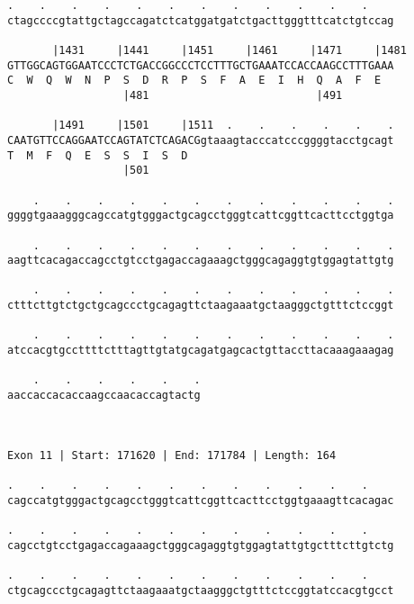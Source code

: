 \documentclass{article}
\begin{document}
\begin{Verbatim}
.    .    .    .    .    .    .    .    .    .    .    .    
ctagccccgtattgctagccagatctcatggatgatctgacttgggtttcatctgtccag
                                                            
       |1431     |1441     |1451     |1461     |1471     |1481
GTTGGCAGTGGAATCCCTCTGACCGGCCCTCCTTTGCTGAAATCCACCAAGCCTTTGAAA
C  W  Q  W  N  P  S  D  R  P  S  F  A  E  I  H  Q  A  F  E  
                  |481                          |491        
  
       |1491     |1501     |1511  .    .    .    .    .    .
CAATGTTCCAGGAATCCAGTATCTCAGACGgtaaagtacccatcccggggtacctgcagt
T  M  F  Q  E  S  S  I  S  D                                
                  |501                                      
  
    .    .    .    .    .    .    .    .    .    .    .    .
ggggtgaaagggcagccatgtgggactgcagcctgggtcattcggttcacttcctggtga
                                                            
    .    .    .    .    .    .    .    .    .    .    .    .
aagttcacagaccagcctgtcctgagaccagaaagctgggcagaggtgtggagtattgtg
                                                            
    .    .    .    .    .    .    .    .    .    .    .    .
ctttcttgtctgctgcagccctgcagagttctaagaaatgctaagggctgtttctccggt
                                                            
    .    .    .    .    .    .    .    .    .    .    .    .
atccacgtgccttttctttagttgtatgcagatgagcactgttaccttacaaagaaagag
                                                            
    .    .    .    .    .    .
aaccaccacaccaagccaacaccagtactg
                              
                              
 
Exon 11 | Start: 171620 | End: 171784 | Length: 164
 
.    .    .    .    .    .    .    .    .    .    .    .    
cagccatgtgggactgcagcctgggtcattcggttcacttcctggtgaaagttcacagac
                                                            
.    .    .    .    .    .    .    .    .    .    .    .    
cagcctgtcctgagaccagaaagctgggcagaggtgtggagtattgtgctttcttgtctg
                                                            
.    .    .    .    .    .    .    .    .    .    .    .    
ctgcagccctgcagagttctaagaaatgctaagggctgtttctccggtatccacgtgcct
                                                            

\end{Verbatim}
\end{document}

